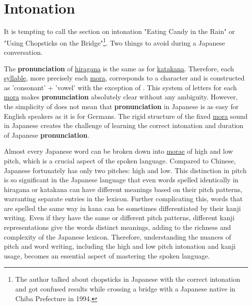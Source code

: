 \section{Intonation}

It is tempting to call the section on intonation "Eating Candy in the Rain" or
"Using Chopsticks on the Bridge"\footnote{The author talked about chopsticks in
Japanese with the correct intonation and got confused results while crossing a
bridge with a Japanese native in Chiba Prefecture in 1994.}. Two things to
avoid during a Japanese conversation.


The \textbf{pronunciation} of \hyperref[sec:Hiragana]{hiragana} is the same as
for \hyperref[sec:Katakana]{katakana}. Therefore, each
\hyperref[sec:Syllable]{syllable}, more precisely each
\hyperref[sec:Mora]{mora}, corresponds to a \hyperref[sec:\jscript]{\jtopic}
character and is constructed as 'consonant' + 'vowel' with the exception of
. This system of letters for each \hyperref[sec:Mora]{mora} makes
\textbf{pronunciation} absolutely clear without any ambiguity. However, the
simplicity of \hyperref[sec:\jscript]{\jtopic} does not mean that
\textbf{pronunciation} in Japanese is as easy for English speakers as it is for
Germans. The rigid structure of the fixed \hyperref[sec:Mora]{mora} sound in
Japanese creates the challenge of learning the correct intonation and duration
of Japanese \textbf{pronunciation}.

Almost every Japanese word can be broken down into \hyperref[sec:Mora]{morae}
of high and low pitch, which is a crucial aspect of the spoken language.
Compared to Chinese, Japanese fortunately has only two pitches: high and low.
This distinction in pitch is so significant in the Japanese language that even
words spelled identically in hiragana or katakana can have different meanings
based on their pitch patterns, warranting separate entries in the lexicon.
Further complicating this, words that are spelled the same way in kana can be
sometimes differentiated by their kanji writing. Even if they have the same or
different pitch patterns, different kanji representations give the words
distinct meanings, adding to the richness and complexity of the Japanese
lexicon. Therefore, understanding the nuances of pitch and word writing,
including the high and low pitch intonation and kanji usage, becomes an
essential aspect of mastering the spoken language.

